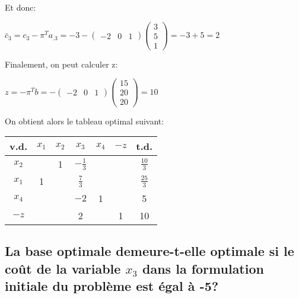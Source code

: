 Et donc:

\begin{center}
	\begin{math}
	\bar{c}_3 = c_3 - \pi^Ta_{.3} = -3 - 
	\begin{pmatrix}
	-2 & 0 & 1
	\end{pmatrix}
	\begin{pmatrix}
		3 \\
		5 \\
		1
	\end{pmatrix}
	= -3 + 5 = 2
	\end{math}
\end{center}

Finalement, on peut calculer z:

\begin{center}
	\begin{math}
	z = -\pi^Tb = - 
	\begin{pmatrix}
	-2 & 0 & 1
	\end{pmatrix}
	\begin{pmatrix}
		15 \\
		20 \\
		20
	\end{pmatrix}
	= 10
	\end{math}
\end{center}
On obtient alors le tableau optimal suivant:

\begin{center}
	\renewcommand{\arraystretch}{1.5}
	\begin{tabular}{|c|ccccc|c|}
		\hline
		v.d.  & $x_1$ & $x_2$ &     $x_3$      & $x_4$ & $-z$ &      t.d.      \\ \hline
		$x_2$ &       &   1   & $-\frac{1}{3}$ &       &      & $\frac{10}{3}$ \\
		$x_1$ &   1   &       & $\frac{7}{3}$  &       &      & $\frac{25}{3}$ \\
		$x_4$ &       &       &      $-2$      &   1   &      &       5        \\ \hline
		$-z$  &       &       &       2        &       &  1   &       10       \\ \hline
	\end{tabular}
\end{center}
	
\subsection{La base optimale demeure-t-elle optimale si le coût de la variable $x_3$ dans la formulation initiale du problème est égal à -5?}
	
